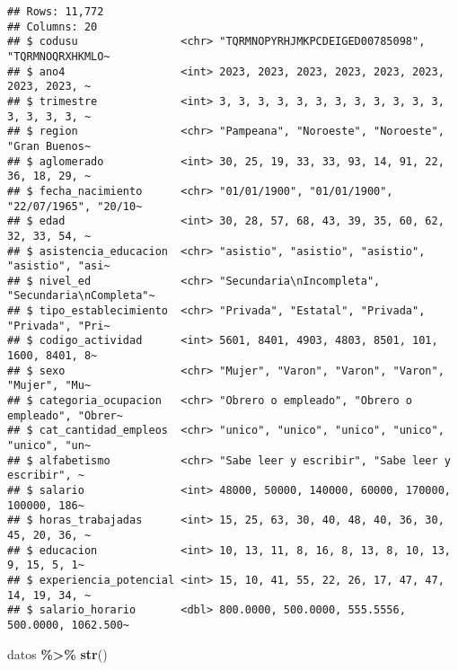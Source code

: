 \documentclass[
]{article}
\newenvironment{Shaded}{\begin{snugshade}}{\end{snugshade}}
\newcommand{\FunctionTok}[1]{\textcolor[rgb]{0.13,0.29,0.53}{\textbf{#1}}}
\newcommand{\NormalTok}[1]{#1}
\newcommand{\SpecialCharTok}[1]{\textcolor[rgb]{0.81,0.36,0.00}{\textbf{#1}}}
\begin{document}
\begin{verbatim}
## Rows: 11,772
## Columns: 20
## $ codusu                <chr> "TQRMNOPYRHJMKPCDEIGED00785098", "TQRMNOQRXHKMLO~
## $ ano4                  <int> 2023, 2023, 2023, 2023, 2023, 2023, 2023, 2023, ~
## $ trimestre             <int> 3, 3, 3, 3, 3, 3, 3, 3, 3, 3, 3, 3, 3, 3, 3, 3, ~
## $ region                <chr> "Pampeana", "Noroeste", "Noroeste", "Gran Buenos~
## $ aglomerado            <int> 30, 25, 19, 33, 33, 93, 14, 91, 22, 36, 18, 29, ~
## $ fecha_nacimiento      <chr> "01/01/1900", "01/01/1900", "22/07/1965", "20/10~
## $ edad                  <int> 30, 28, 57, 68, 43, 39, 35, 60, 62, 32, 33, 54, ~
## $ asistencia_educacion  <chr> "asistio", "asistio", "asistio", "asistio", "asi~
## $ nivel_ed              <chr> "Secundaria\nIncompleta", "Secundaria\nCompleta"~
## $ tipo_establecimiento  <chr> "Privada", "Estatal", "Privada", "Privada", "Pri~
## $ codigo_actividad      <int> 5601, 8401, 4903, 4803, 8501, 101, 1600, 8401, 8~
## $ sexo                  <chr> "Mujer", "Varon", "Varon", "Varon", "Mujer", "Mu~
## $ categoria_ocupacion   <chr> "Obrero o empleado", "Obrero o empleado", "Obrer~
## $ cat_cantidad_empleos  <chr> "unico", "unico", "unico", "unico", "unico", "un~
## $ alfabetismo           <chr> "Sabe leer y escribir", "Sabe leer y escribir", ~
## $ salario               <int> 48000, 50000, 140000, 60000, 170000, 100000, 186~
## $ horas_trabajadas      <int> 15, 25, 63, 30, 40, 48, 40, 36, 30, 45, 20, 36, ~
## $ educacion             <int> 10, 13, 11, 8, 16, 8, 13, 8, 10, 13, 9, 15, 5, 1~
## $ experiencia_potencial <int> 15, 10, 41, 55, 22, 26, 17, 47, 47, 14, 19, 34, ~
## $ salario_horario       <dbl> 800.0000, 500.0000, 555.5556, 500.0000, 1062.500~
\end{verbatim}

\begin{Shaded}
\begin{Highlighting}[]
\NormalTok{datos }\SpecialCharTok{\%\textgreater{}\%} \FunctionTok{str}\NormalTok{()}
\end{Highlighting}
\end{Shaded}
\end{document}
